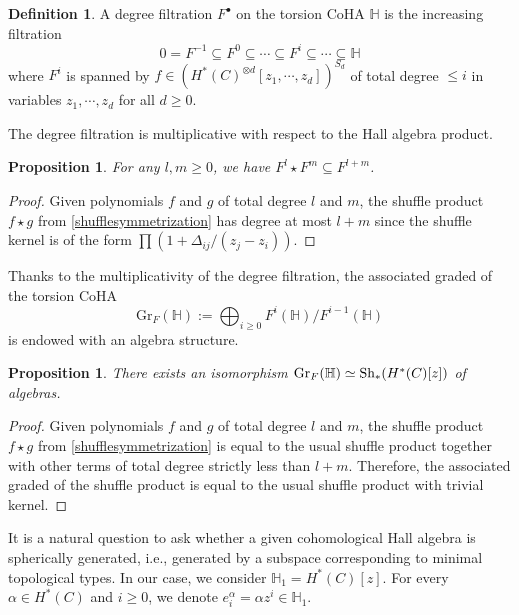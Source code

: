 \documentclass[10pt]{amsart}
\newcommand{\BH}{\mathbb{H}}
\newcommand{\+}{{}^+}
\newcommand{\Sh}{\textnormal{Sh}}
\newtheorem {proposition}[theorem]{Proposition}
\theoremstyle{definition}
\theoremstyle {definition}
\theoremstyle {definition}
\newtheorem{definition}[theorem]{Definition}
\begin{document}
\begin{definition} \label{defn:filtration}A degree filtration $F^\bullet$ on the torsion CoHA $\BH$ is the increasing filtration
\[ 0=F^{-1} \subseteq F^0\subseteq \cdots \subseteq  F^i \subseteq \cdots \subseteq \mathbb{H}\] 
where $F^i$ is spanned by $f \in (H^{*}(C)^{\otimes d}[z_1,\cdots,z_d])^{S_d}$ of total degree $\leq i$ in variables $z_1, \cdots,z_d$ for all $d\geq 0$.

\end{definition}

The degree filtration is multiplicative with respect to the Hall algebra product. 

\begin{proposition}
For any $l, m \geq 0$, we have $F^l \star F^m \subseteq F^{l+m}$. 
\end{proposition}

\begin{proof}
Given polynomials $f$ and $g$ of total degree $l$ and $m$, the shuffle product $f \star g$ from \eqref{shufflesymmetrization} has degree at most $l+m$ since the shuffle kernel is of the form $\prod (1+ \Delta_{ij}/(z_j-z_i))$. 
\end{proof}

Thanks to the multiplicativity of the degree filtration, the associated graded of the torsion CoHA
\[\mathrm{Gr}_F(\mathbb{H}) := \bigoplus_{i \geq 0 } F^{i}(\mathbb{H})/F^{i-1}(\mathbb{H})\] 
is endowed with an algebra structure. 

\begin{proposition} \label{prop: associatedgraded}
There exists an isomorphism $\mathrm{Gr}_F(\mathbb{H})\simeq \Sh_{*}(H^*(C)[z])$ of algebras. 
\end{proposition}

\begin{proof}
Given polynomials $f$ and $g$ of total degree $l$ and $m$, the shuffle product $f \star g$ from \eqref{shufflesymmetrization} is equal to the usual shuffle product together with other terms of total degree strictly less than $l+m$. Therefore, the associated graded of the shuffle product is equal to the usual shuffle product with trivial kernel.
\end{proof}


It is a natural question to ask whether a given cohomological Hall algebra is spherically generated, i.e., generated by a subspace corresponding to minimal topological types. In our case, we consider $\BH_1=H^*(C)[z].$ For every $\alpha \in H^*(C)$ and $i \geq 0$, we denote $e^{\alpha}_i = \alpha z^i \in \BH_1$. 
\end{document}
